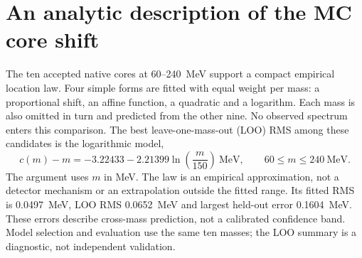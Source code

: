 \clearpage
\section{An analytic description of the MC core shift}
The ten accepted native cores at 60--240~MeV support a compact empirical
location law. Four simple forms are fitted with equal weight per mass:
a proportional shift, an affine function, a quadratic and a logarithm.
Each mass is also omitted in turn and predicted from the other nine.
No observed spectrum enters this comparison. The best leave-one-mass-out
(LOO) RMS among these candidates is the logarithmic model,
\begin{equation}
 c(m)-m=-3.22433-2.21399\ln\!\left(\frac{m}{150}\right)\ \mathrm{MeV},
 \qquad 60\leq m\leq240~\mathrm{MeV}.
\end{equation}
The argument uses $m$ in MeV. The law is an empirical approximation,
not a detector mechanism or an extrapolation outside the fitted range.
Its fitted RMS is 0.0497~MeV, LOO RMS 0.0652~MeV and largest held-out
error 0.1604~MeV. These errors describe cross-mass prediction, not a
calibrated confidence band. Model selection and evaluation use the same
ten masses; the LOO summary is a diagnostic, not independent validation.
\begin{table}[H]\centering\small

\caption{Analytic model comparison. Affine and quadratic forms use
$x=(m-150)/100$; coefficients and all held-out predictions are saved.}
\end{table}

\clearpage
